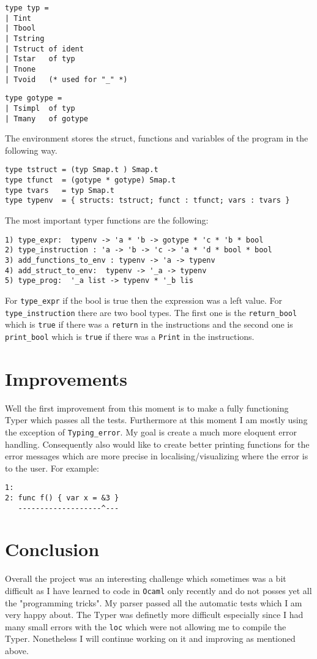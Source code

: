 \documentclass{article}
\begin{document}
\begin{verbatim}
type typ =
| Tint
| Tbool
| Tstring
| Tstruct of ident
| Tstar   of typ
| Tnone
| Tvoid   (* used for "_" *)
\end{verbatim}

\begin{verbatim}
type gotype =
| Tsimpl  of typ
| Tmany   of gotype 
\end{verbatim}

The environment stores the struct, functions and variables of the program in the following way. \begin{verbatim}
type tstruct = (typ Smap.t ) Smap.t
type tfunct  = (gotype * gotype) Smap.t  
type tvars   = typ Smap.t 
type typenv  = { structs: tstruct; funct : tfunct; vars : tvars }   
\end{verbatim}
The most important typer functions are the following:
\begin{verbatim}
1) type_expr:  typenv -> 'a * 'b -> gotype * 'c * 'b * bool  
2) type_instruction : 'a -> 'b -> 'c -> 'a * 'd * bool * bool
3) add_functions_to_env : typenv -> 'a -> typenv
4) add_struct_to_env:  typenv -> '_a -> typenv
5) type_prog:  '_a list -> typenv * '_b lis
\end{verbatim}
For \texttt{type\_expr} if the bool is true then the expression was a left value. 
For \texttt{type\_instruction} there are two bool types. The first one is the \texttt{return\_bool} which is \texttt{true} if there was a \texttt{return} in the instructions and the second one is \texttt{print\_bool} which is \texttt{true} if there was a \texttt{Print} in the instructions.

\section*{Improvements}
Well the first improvement from this moment is to make a fully functioning Typer which passes all the tests. Furthermore at this moment I am mostly using the exception of \texttt{Typing\_error}. My goal is create a much more eloquent error handling. Consequently also would like to create better printing functions for the error messages which are more precise in localising/visualizing where the error is to the user. For example: \begin{verbatim}
1:
2: func f() { var x = &3 }
   -------------------^---
\end{verbatim}

\section*{Conclusion}
Overall the project was an interesting challenge which sometimes was a bit difficult as I have learned to code in \texttt{Ocaml} only recently and do not posses yet all the "programming tricks". My parser passed all the automatic tests which I am very happy about. The Typer was definetly more difficult especially since I had many small errors with the \texttt{loc} which were not allowing me to compile the Typer.  Nonetheless I will continue working on it and improving as mentioned above.
\end{document}
